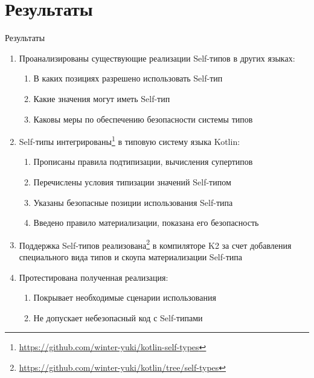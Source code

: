 \documentclass[aspectratio=169,usenames,dvipsnames]{beamer}
\begin{document}
    \section{Результаты}

    \begin{frame}{Результаты}

        \begin{enumerate}
            \item Проанализированы существующие реализации Self-типов в других языках:
            \begin{enumerate}
                \item В каких позициях разрешено использовать Self-тип
                \item Какие значения могут иметь Self-тип
                \item Каковы меры по обеспечению безопасности системы типов
            \end{enumerate}
            \item Self-типы интегрированы\footnote{\url{https://github.com/winter-yuki/kotlin-self-types}} в типовую систему языка Kotlin:
            \begin{enumerate}
                \item Прописаны правила подтипизации, вычисления супертипов
                \item Перечислены условия типизации значений Self-типом
                \item Указаны безопасные позиции использования Self-типа
                \item Введено правило материализации, показана его безопасность
            \end{enumerate}
            \item Поддержка Self-типов реализована\footnote{\url{https://github.com/winter-yuki/kotlin/tree/self-types}} в компиляторе K2 за счет добавления специального вида типов и скоупа материализации Self-типа
            \item Протестирована полученная реализация:
            \begin{enumerate}
                \item Покрывает необходимые сценарии использования
                \item Не допускает небезопасный код с Self-типами
            \end{enumerate}
        \end{enumerate}
    \end{frame}
\end{document}
